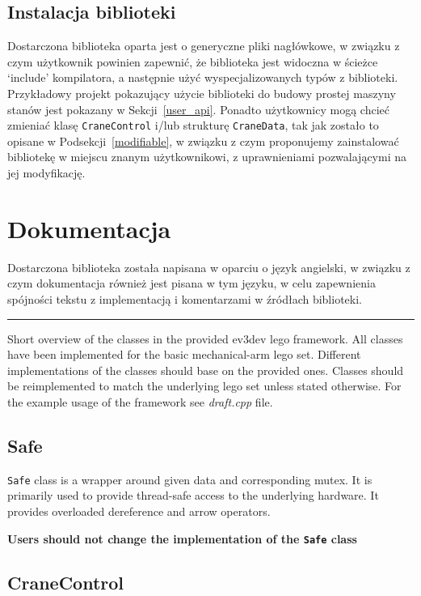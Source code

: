 \documentclass{article}
\begin{document}
\subsection{Instalacja biblioteki}
Dostarczona biblioteka oparta jest o generyczne pliki nagłówkowe, w związku z
czym użytkownik powinien zapewnić, że biblioteka jest widoczna w ścieżce
`include' kompilatora, a następnie użyć wyspecjalizowanych typów z biblioteki.
Przykładowy projekt pokazujący użycie biblioteki do budowy prostej maszyny
stanów jest pokazany w Sekcji~\ref{user_api}. Ponadto użytkownicy mogą chcieć
zmieniać klasę \texttt{CraneControl} i/lub strukturę \texttt{CraneData}, tak jak
zostało to opisane w Podsekcji~\ref{modifiable}, w związku z czym proponujemy
zainstalować bibliotekę w miejscu znanym użytkownikowi, z uprawnieniami
pozwalającymi na jej modyfikację.
\section{Dokumentacja}\label{docs}
Dostarczona biblioteka została napisana w oparciu o język angielski, w związku z
czym dokumentacja również jest pisana w tym języku, w celu zapewnienia spójności
tekstu z implementacją i komentarzami w źródłach biblioteki.
\begin{center}\rule{0.5\linewidth}{\linethickness}\end{center}

Short overview of the classes in the provided ev3dev lego framework. All
classes have been implemented for the basic mechanical-arm lego set.
Different implementations of the classes should base on the provided
ones. Classes should be reimplemented to match the underlying lego set
unless stated otherwise. For the example usage of the framework see
\textit{draft.cpp} file.

\subsection*{Safe}\label{safe}

\texttt{Safe} class is a wrapper around given data and corresponding
mutex. It is primarily used to provide thread-safe access to the
underlying hardware. It provides overloaded dereference and arrow
operators.

\textbf{Users should not change the implementation of the \texttt{Safe}
class}

\subsection*{CraneControl}\label{cranecontrol}
\end{document}
